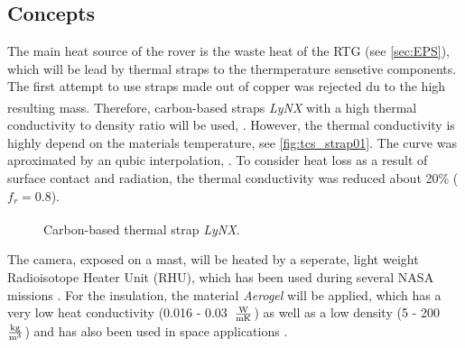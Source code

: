 \subsection{Concepts}
The main heat source of the rover is the waste heat of the RTG (see \autoref{sec:EPS}), which will be lead by thermal straps to the thermperature sensetive components.
The first attempt to use straps made out of copper was rejected du to the high resulting mass.
Therefore, carbon-based straps \textit{LyNX}\textsuperscript{\tiny\textregistered} with a high thermal conductivity to density ratio will be used, \cite{ref_tcs_01}.
However, the thermal conductivity is highly depend on the materials temperature, see \autoref{fig:tcs_strap01}.
The curve was aproximated by an qubic interpolation, .
To consider heat loss as a result of surface contact and radiation, the thermal conductivity was reduced about 20\% ($f_{r}=0.8$).


\begin{figure}[h]
	\centering
	\qquad\qquad
	\caption{Carbon-based thermal strap \textit{LyNX}\textsuperscript{\tiny\textregistered}.}
	\label{fig:tcs_strap01}
\end{figure}


The camera, exposed on a mast, will be heated by a seperate, light weight Radioisotope Heater Unit (RHU), which has  been used during several NASA missions \cite{ref_tcs_02}.
For the insulation, the material \textit{Aerogel} will be applied, which has a very low heat conductivity (0.016 - 0.03\ $\frac{{\rm W}}{{\rm m} {\rm K}} $) as well as a low density (5 - 200\ $\frac{{\rm kg}}{{\rm m}^3}$) and has also been used in space applications \cite{ref_tcs_03}.

